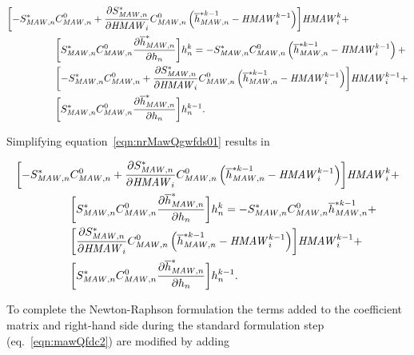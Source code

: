 \begin{equation}
	\label{eqn:nrMawQgwfds01}
	\begin{aligned}
		\biggl[ -S_{\mathit{MAW},n}^* &C_{\mathit{MAW},n}^0 + \frac{\partial S_{\mathit{MAW},n}^*}{\partial \mathit{HMAW}_i} C_{\mathit{MAW},n}^0 \left( \overline{h}_{\mathit{MAW},n}^{*k-1} - \mathit{HMAW}_{i}^{k-1} \right)  \biggr] \mathit{HMAW}_i^k + \\
		&\biggl[ S_{\mathit{MAW},n}^* C_{\mathit{MAW},n}^0 \frac{\partial \overline{h}^*_{\mathit{MAW},n}}{\partial h_n} \biggr]  h^k_n = - S_{\mathit{MAW},n}^* C_{\mathit{MAW},n}^0 \left( \overline{h}_{\mathit{MAW},n}^{*k-1} - \mathit{HMAW}_{i}^{k-1} \right) + \\
		&\biggl[ -S_{\mathit{MAW},n}^* C_{\mathit{MAW},n}^0 + \frac{\partial S_{\mathit{MAW},n}^*}{\partial \mathit{HMAW}_i} C_{\mathit{MAW},n}^0 \left( \overline{h}_{\mathit{MAW},n}^{*k-1} - \mathit{HMAW}_{i}^{k-1} \right) \biggr] \mathit{HMAW}_i^{k-1} + \\ &
		\biggl[ S_{\mathit{MAW},n}^* C_{\mathit{MAW},n}^0 \frac{\partial \overline{h}^*_{\mathit{MAW},n}}{\partial h_n} \biggr]  h^{k-1}_n .
	\end{aligned}
\end{equation}

\noindent Simplifying equation~\ref{eqn:nrMawQgwfds01} results in

\begin{equation}
	\label{eqn:nrMawQgwfds02}
	\begin{aligned}
		\biggl[ -S_{\mathit{MAW},n}^* &C_{\mathit{MAW},n}^0 + \frac{\partial S_{\mathit{MAW},n}^*}{\partial \mathit{HMAW}_i} C_{\mathit{MAW},n}^0 \left( \overline{h}_{\mathit{MAW},n}^{*k-1} - \mathit{HMAW}_{i}^{k-1} \right)  \biggr] \mathit{HMAW}_i^k + \\
		&\biggl[ S_{\mathit{MAW},n}^* C_{\mathit{MAW},n}^0 \frac{\partial \overline{h}^*_{\mathit{MAW},n}}{\partial h_n} \biggr]  h^k_n = - S_{\mathit{MAW},n}^* C_{\mathit{MAW},n}^0 \overline{h}_{\mathit{MAW},n}^{*k-1} + \\
		&\biggl[ \frac{\partial S_{\mathit{MAW},n}^*}{\partial \mathit{HMAW}_i} C_{\mathit{MAW},n}^0 \left( \overline{h}_{\mathit{MAW},n}^{*k-1} - \mathit{HMAW}_{i}^{k-1} \right) \biggr] \mathit{HMAW}_i^{k-1} + \\ &
		\biggl[ S_{\mathit{MAW},n}^* C_{\mathit{MAW},n}^0 \frac{\partial \overline{h}^*_{\mathit{MAW},n}}{\partial h_n} \biggr]  h^{k-1}_n .
	\end{aligned}
\end{equation}

\noindent To complete the Newton-Raphson formulation the terms added to the coefficient matrix and right-hand side during the standard formulation step (eq.~\ref{eqn:mawQfdc2}) are modified by adding

